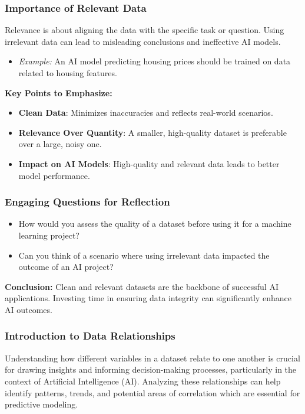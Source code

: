 \documentclass[aspectratio=169]{beamer}
\begin{document}
\begin{frame}[fragile]
  \frametitle{Importance of Relevant Data}

  Relevance is about aligning the data with the specific task or question. Using irrelevant data can lead to misleading conclusions and ineffective AI models.
  
  \begin{itemize}
    \item \textit{Example:} An AI model predicting housing prices should be trained on data related to housing features.
  \end{itemize}

  \textbf{Key Points to Emphasize:}
  
  \begin{itemize}
    \item \textbf{Clean Data}: Minimizes inaccuracies and reflects real-world scenarios.
    \item \textbf{Relevance Over Quantity}: A smaller, high-quality dataset is preferable over a large, noisy one.
    \item \textbf{Impact on AI Models}: High-quality and relevant data leads to better model performance.
  \end{itemize}

\end{frame}

\begin{frame}[fragile]
  \frametitle{Engaging Questions for Reflection}

  \begin{itemize}
    \item How would you assess the quality of a dataset before using it for a machine learning project?
    \item Can you think of a scenario where using irrelevant data impacted the outcome of an AI project?
  \end{itemize}

  \textbf{Conclusion:} Clean and relevant datasets are the backbone of successful AI applications. Investing time in ensuring data integrity can significantly enhance AI outcomes.
  
\end{frame}

\begin{frame}[fragile]
    \frametitle{Introduction to Data Relationships}
    Understanding how different variables in a dataset relate to one another is crucial for drawing insights and informing decision-making processes, particularly in the context of Artificial Intelligence (AI). Analyzing these relationships can help identify patterns, trends, and potential areas of correlation which are essential for predictive modeling.
\end{frame}
\end{document}
